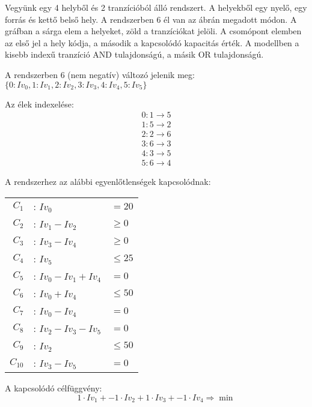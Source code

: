 Vegyünk egy 4 helyből és 2 tranzícióból álló rendszert. A helyekből egy nyelő, egy forrás és kettő belső hely. A rendszerben 6 él van az ábrán megadott módon.  A gráfban a sárga elem a helyeket, zöld a tranzíciókat jelöli. A csomópont elemben az első jel a hely kódja, a második a kapcsolódó kapacitás érték. A modellben a kisebb indexű tranzíció AND tulajdonságú, a másik OR tulajdonságú. 

A rendszerben 6 (nem negatív) változó jelenik meg:  $\{0: Iv_0, 1: Iv_1, 2: Iv_2, 3: Iv_3, 4: Iv_4, 5: Iv_5\}$

Az élek indexelése:
\begin{align*}
0  :  1 \rightarrow 5  \\
1  :  5 \rightarrow 2  \\
2  :  2 \rightarrow 6  \\
3  :  6 \rightarrow 3  \\
4  :  3 \rightarrow 5  \\
5  :  6 \rightarrow 4 
\end{align*}

A rendszerhez az alábbi egyenlőtlenségek kapcsolódnak:

\begin{center}
\begin{tabular}{rll}
$C_1$ &: $Iv_0$ &$= 20$ \\
$C_2$ &: $Iv_1 - Iv_2$ &$\geq 0$\\
$C_3$ &: $Iv_3 - Iv_4$ &$\geq 0$\\
$C_4$ &: $Iv_5$ &$\leq 25$\\
$C_5$ &: $Iv_0 - Iv_1 + Iv_4$ &$= 0$\\
$C_6$ &: $Iv_0 + Iv_4 $&$\leq 50$\\
$C_7$ &: $Iv_0 - Iv_4 $&$= 0$\\
$C_8$ &: $Iv_2 - Iv_3 - Iv_5$&$= 0$\\
$C_9$ &: $Iv_2 $&$\leq 50$\\
$C_{10}$ &: $Iv_3 - Iv_5 $&$= 0$
\end{tabular}
\end{center}

A kapcsolódó célfüggvény:
$$1\cdot Iv_1 + -1\cdot Iv_2 + 1\cdot Iv_3 + -1\cdot Iv_4\Rightarrow \min$$

